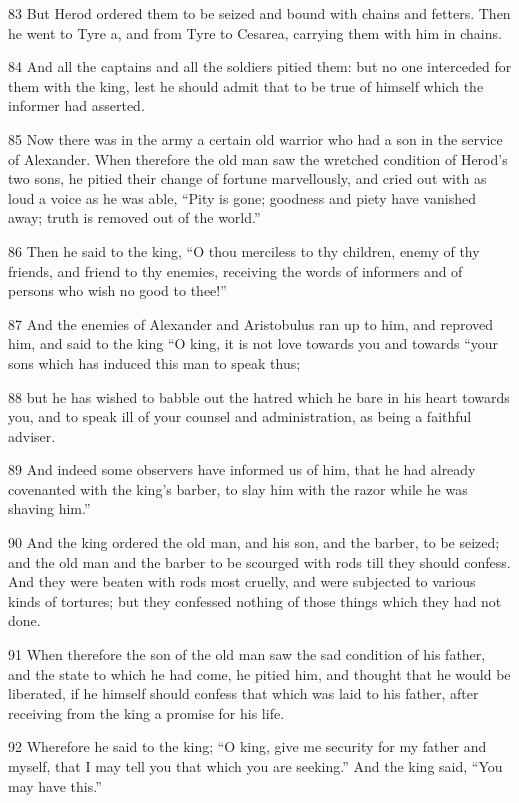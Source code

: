 83 But Herod ordered them to be seized and bound with chains and fetters. Then he went to Tyre a, and from Tyre to Cesarea, carrying them with him in chains. 

84 And all the captains and all the soldiers pitied them: but no one interceded for them with the king, lest he should admit that to be true of himself which the informer had asserted. 

85 Now there was in the army a certain old warrior who had a son in the service of Alexander. When therefore the old man saw the wretched condition of Herod’s two sons, he pitied their change of fortune marvellously, and cried out with as loud a voice as he was able, “Pity is gone; goodness and piety have vanished away; truth is removed out of the world.” 

86 Then he said to the king, “O thou merciless to thy children, enemy of thy friends, and friend to thy enemies, receiving the words of informers and of persons who wish no good to thee!” 

87 And the enemies of Alexander and Aristobulus ran up to him, and reproved him, and said to the king “O king, it is not love towards you and towards “your sons which has induced this man to speak thus; 

88 but he has wished to babble out the hatred which he bare in his heart towards you, and to speak ill of your counsel and administration, as being a faithful adviser. 

89 And indeed some observers have informed us of him, that he had already covenanted with the king’s barber, to slay him with the razor while he was shaving him.” 

90 And the king ordered the old man, and his son, and the barber, to be seized; and the old man and the barber to be scourged with rods till they should confess. And they were beaten with rods most cruelly, and were subjected to various kinds of tortures; but they confessed nothing of those things which they had not done. 

91 When therefore the son of the old man saw the sad condition of his father, and the state to which he had come, he pitied him, and thought that he would be liberated, if he himself should confess that which was laid to his father, after receiving from the king a promise for his life. 

92 Wherefore he said to the king; “O king, give me security for my father and myself, that I may tell you that which you are seeking.” And the king said, “You may have this.” 

